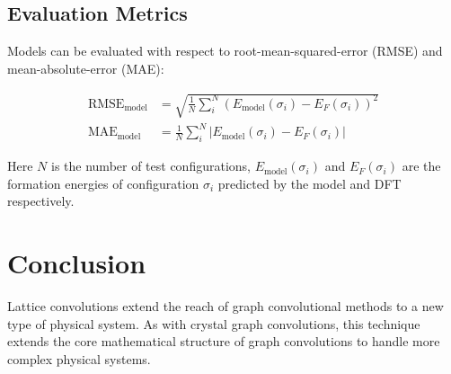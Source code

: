 \documentclass[book.tex]{subfiles}
\begin{document}

\subsection{Evaluation Metrics}

Models can be evaluated with respect to root-mean-squared-error (RMSE) and mean-absolute-error (MAE):

\begin{align}
\textrm{RMSE}_{\textrm{model}} &= \sqrt{\frac{1}{N}\sum_i^N (E_{\textrm{model}}(\sigma_i) - E_F(\sigma_i))^2} \\
\textrm{MAE}_{\textrm{model}} &= \frac{1}{N}\sum_i^N | E_{\textrm{model}}(\sigma_i) - E_F(\sigma_i)| 
\end{align} 

Here $N$ is the number of test configurations, $E_{\textrm{model}}(\sigma_i)$ and $E_F(\sigma_i)$ are the formation energies of configuration $\sigma_i$ predicted by the model and DFT respectively. %


\section{Conclusion}

Lattice convolutions extend the reach of graph convolutional methods to a new type of physical system. As with crystal graph convolutions, this technique extends the core mathematical structure of graph convolutions to handle more complex physical systems. 
\end{document}
